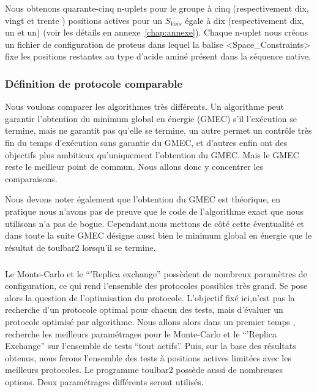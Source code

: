 Nous obtenons quarante-cinq n-uplets pour le groupe à cinq (respectivement dix, vingt et trente ) positions actives pour un $S_{Vois}$ égale à dix (respectivement dix, un et un) (voir les détails en annexe~\ref{chap:annexe}). Chaque n-uplet nous créons un fichier de configuration de proteus dans lequel la balise <Space\_Constraints> fixe les positions restantes au type d'acide aminé présent dans la séquence native. 


\subsubsection{Définition de protocole comparable}

Nous voulons comparer les algorithmes très différents. Un algorithme peut garantir l'obtention du minimum global en énergie (GMEC) s'il l'exécution se termine, mais ne garantit pas qu'elle se termine, un autre permet un contrôle très fin du temps d'exécution sans garantie du GMEC, et d'autres enfin ont des objectifs plus ambitieux  qu'uniquement l'obtention du GMEC.
Mais le GMEC reste le meilleur point de commun. Nous allons donc y concentrer les comparaisons.

Nous devons noter également que l'obtention du GMEC est théorique, en pratique nous n'avons pas de preuve que le code de l'algorithme exact que nous utilisons n'a pas de bogue. Cependant,nous mettons de côté cette éventualité et dans toute la suite GMEC désigne aussi bien le minimum global en énergie que le résultat de toulbar2 lorsqu'il se termine.  
\subparagraph{}
Le Monte-Carlo et le ``'Replica exchange'' possèdent de nombreux paramètres de configuration, ce qui rend l'ensemble des protocoles possibles très grand. Se pose alors la question de l'optimisation du protocole. L'objectif fixé ici,n'est pas la recherche d'un protocole optimal pour chacun des tests, mais d'évaluer un protocole optimisé par algorithme.
Nous allons alors dans un premier temps , recherche les meilleurs paramétrages pour le Monte-Carlo et le ``'Replica Exchange'' sur l'ensemble de tests ``tout actifs'.'
Puis, sur la base des résultats obtenus, nous ferons l'ensemble des tests à positions actives limitées avec les meilleurs protocoles.
Le programme toulbar2 possède aussi de nombreuses options. Deux paramétrages différents seront utilisés.


